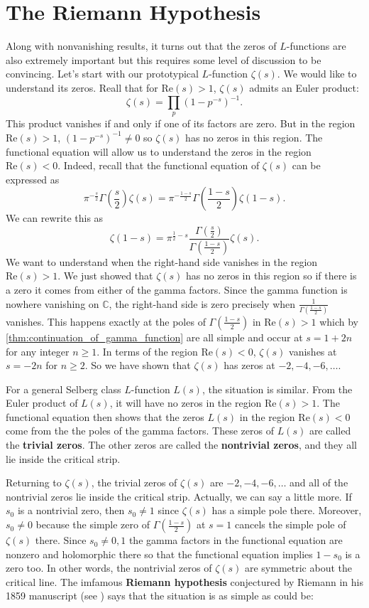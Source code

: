 \documentclass[12pt]{book}
\theoremstyle{definition}\newframedtheorem{method}{Method}
\newcommand{\C}{\mathbb{C}}
\newcommand{\z}{\zeta}
\newcommand{\G}{\Gamma}
\newcommand{\<}{\langle}
\renewcommand{\>}{\rangle}
\renewcommand{\Re}{\mathrm{Re}}
\begin{document}
  \section{The Riemann Hypothesis}
    Along with nonvanishing results, it turns out that the zeros of $L$-functions are also extremely important but this requires some level of discussion to be convincing. Let's start with our prototypical $L$-function $\z(s)$. We would like to understand its zeros. Reall that for $\Re(s) > 1$, $\z(s)$ admits an Euler product:
    \[
      \z(s) = \prod_{p}(1-p^{-s})^{-1}.
    \]
    This product vanishes if and only if one of its factors are zero. But in the region $\Re(s) > 1$, $(1-p^{-s})^{-1} \neq 0$ so $\z(s)$ has no zeros in this region. The functional equation will allow us to understand the zeros in the region $\Re(s) < 0$. Indeed, recall that the functional equation of $\z(s)$ can be expressed as
    \[
      \pi^{-\frac{s}{2}}\G\left(\frac{s}{2}\right)\z(s) = \pi^{-\frac{1-s}{2}}\G\left(\frac{1-s}{2}\right)\z(1-s).
    \]
    We can rewrite this as
    \[
      \z(1-s) = \pi^{\frac{1}{2}-s}\frac{\G\left(\frac{s}{2}\right)}{\G\left(\frac{1-s}{2}\right)}\z(s).
    \]
    We want to understand when the right-hand side vanishes in the region $\Re(s) > 1$. We just showed that $\z(s)$ has no zeros in this region so if there is a zero it comes from either of the gamma factors. Since the gamma function is nowhere vanishing on $\C$, the right-hand side is zero precisely when $\frac{1}{\G\left(\frac{1-s}{2}\right)}$ vanishes. This happens exactly at the poles of $\G\left(\frac{1-s}{2}\right)$ in $\Re(s) > 1$ which by \cref{thm:continuation_of_gamma_function} are all simple and occur at $s = 1+2n$ for any integer $n \ge 1$. In terms of the region $\Re(s) < 0$, $\z(s)$ vanishes at $s = -2n$ for $n \ge 2$. So we have shown that $\z(s)$ has zeros at $-2,-4,-6,\ldots$.

    For a general Selberg class $L$-function $L(s)$, the situation is similar. From the Euler product of $L(s)$, it will have no zeros in the region $\Re(s) > 1$. The functional equation then shows that the zeros $L(s)$ in the region $\Re(s) < 0$ come from the the poles of the gamma factors. These zeros of $L(s)$ are called the \textbf{trivial zeros}. The other zeros are called the \textbf{nontrivial zeros}, and they all lie inside the critical strip.

    Returning to $\z(s)$, the trivial zeros of $\z(s)$ are $-2,-4,-6,\ldots$ and all of the nontrivial zeros lie inside the critical strip. Actually, we can say a little more. If $s_{0}$ is a nontrivial zero, then $s_{0} \neq 1$ since $\z(s)$ has a simple pole there. Moreover, $s_{0} \neq 0$ because the simple zero of $\G\left(\frac{1-s}{2}\right)$ at $s = 1$ cancels the simple pole of $\z(s)$ there. Since $s_{0} \neq 0,1$ the gamma factors in the functional equation are nonzero and holomorphic there so that the functional equation implies $1-s_{0}$ is a zero too. In other words, the nontrivial zeros of $\z(s)$ are symmetric about the critical line. The imfamous \textbf{Riemann hypothesis} conjectured by Riemann in his 1859 manuscript (see \cite{riemann1859ueber}) says that the situation is as simple as could be:
\end{document}
